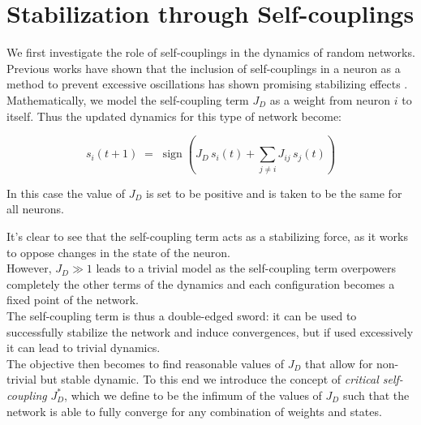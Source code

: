 \documentclass[a4paper,12pt]{report}
\begin{document}
\section{Stabilization through Self-couplings}\label{sec: sc_stabilization}

We first investigate the role of self-couplings in the dynamics of random networks.
Previous works have shown that the inclusion of self-couplings in a neuron as a 
method to prevent excessive oscillations has shown promising stabilizing effects 
\cite{Student2024}. \\
Mathematically, we model the self-coupling term $J_D$ as a weight from neuron $i$ to 
itself. Thus the updated dynamics for this type of network become:

\begin{equation}\label{eq:Self_coupling_update}
  s_i(t+1) \;=\; \operatorname{sign}\left( J_D\,s_i(t) + \sum_{j\neq i} J_{ij}\,s_j(t) \right)
\end{equation}

In this case the value of $J_D$ is set to be positive and is taken to be the same for 
all neurons.

It's clear to see that the self-coupling term acts as a stabilizing force, as it works
to oppose changes in the state of the neuron.\\
However, $J_D \gg 1$ leads to a trivial model as the self-coupling term overpowers 
completely the other terms of the dynamics and each configuration becomes a fixed point 
of the network.\\
The self-coupling term is thus a double-edged sword: it can be used to
successfully stabilize the network and induce convergences, but if used excessively 
it can lead to trivial dynamics. \\
The objective then becomes to find reasonable values of $J_D$ that allow for 
non-trivial but stable dynamic. To this end we introduce the concept of 
\emph{critical self-coupling} $J^*_D$, which we define to be the infimum of the 
values of $J_D$ such that the network is able to fully converge for any combination 
of weights and states.
\end{document}
